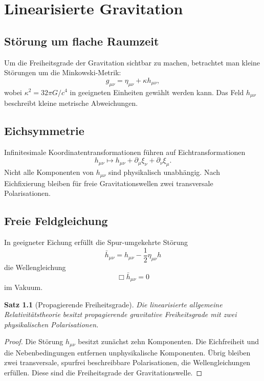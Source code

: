 \documentclass[11pt,a4paper]{book}
\newtheorem{satz}{Satz}[chapter]
\theoremstyle{remark}
\newcommand{\Boxop}{\Box}
\begin{document}
\chapter{Linearisierte Gravitation}
\section{Störung um flache Raumzeit}
Um die Freiheitsgrade der Gravitation sichtbar zu machen, betrachtet man kleine Störungen um die Minkowski-Metrik:
\begin{equation}
g_{\mu\nu}=\eta_{\mu\nu}+\kappa h_{\mu\nu},
\end{equation}
wobei $\kappa^2=32\pi G/c^4$ in geeigneten Einheiten gewählt werden kann. Das Feld $h_{\mu\nu}$ beschreibt kleine metrische Abweichungen.

\section{Eichsymmetrie}
Infinitesimale Koordinatentransformationen führen auf Eichtransformationen
\begin{equation}
h_{\mu\nu}\mapsto h_{\mu\nu}+\partial_\mu\xi_\nu+\partial_\nu\xi_\mu.
\end{equation}
Nicht alle Komponenten von $h_{\mu\nu}$ sind physikalisch unabhängig. Nach Eichfixierung bleiben für freie Gravitationswellen zwei transversale Polarisationen.

\section{Freie Feldgleichung}
In geeigneter Eichung erfüllt die Spur-umgekehrte Störung
\begin{equation}
\bar h_{\mu\nu}=h_{\mu\nu}-\frac{1}{2}\eta_{\mu\nu}h
\end{equation}
die Wellengleichung
\begin{equation}
\Boxop \bar h_{\mu\nu}=0
\end{equation}
im Vakuum.

\begin{satz}[Propagierende Freiheitsgrade]
Die linearisierte allgemeine Relativitätstheorie besitzt propagierende gravitative Freiheitsgrade mit zwei physikalischen Polarisationen.
\end{satz}

\begin{proof}
Die Störung $h_{\mu\nu}$ besitzt zunächst zehn Komponenten. Die Eichfreiheit und die Nebenbedingungen entfernen unphysikalische Komponenten. Übrig bleiben zwei transversale, spurfrei beschreibbare Polarisationen, die Wellengleichungen erfüllen. Diese sind die Freiheitsgrade der Gravitationswelle.
\end{proof}
\end{document}
